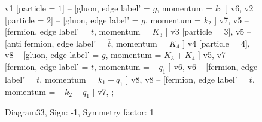 \documentclass{revtex4}
\begin{document}
\begin{figure}[!htb]
\begin{center}
{    %
v1 [particle = \(1\)] -- [gluon, edge label' = \(g\), momentum = \(k_{1}\) ] v6, 
v2 [particle = \(2\)] -- [gluon, edge label' = \(g\), momentum = \(k_{2}\) ] v7, 
v5 -- [fermion, edge label' = \(t\), momentum = \(K_{3}\) ] v3 [particle = \(3\)], 
v5 -- [anti fermion, edge label' = \(\overline{t}\), momentum = \(K_{4}\) ] v4 [particle = \(4\)], 
v8 -- [gluon, edge label' = \(g\), momentum = \(K_{3} + K_{4}\) ] v5, 
v7 -- [fermion, edge label' = \(t\), momentum = \(-q_{1}\) ] v6, 
v6 -- [fermion, edge label' = \(t\), momentum = \(k_{1} - q_{1}\) ] v8, 
v8 -- [fermion, edge label' = \(t\), momentum = \(-k_{2} - q_{1}\) ] v7, 
};
\end{center}
\caption{Diagram33, Sign: -1, Symmetry factor: 1}
\end{figure}
\newpage
\end{document}
